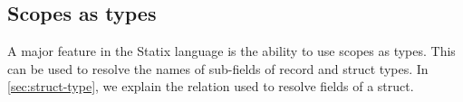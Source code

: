 \subsection{Scopes as types}
A major feature in the Statix language is the ability to use scopes as types. This can be used to resolve the names of sub-fields of record and struct types\cite{antwerpen}. In \autoref{sec:struct-type}, we explain the relation used to resolve fields of a struct.  

